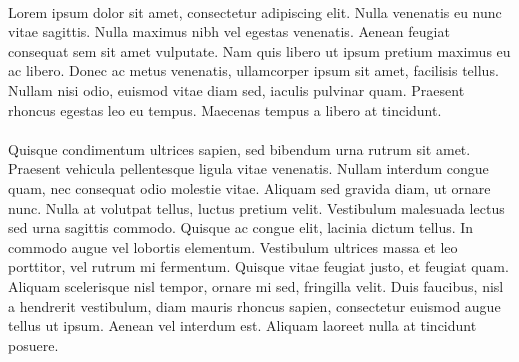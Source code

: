 \documentclass[../main.tex]{subfiles}
\begin{document}
\paragraph{}
Lorem ipsum dolor sit amet, consectetur adipiscing elit. Nulla venenatis eu nunc vitae sagittis. Nulla maximus nibh vel egestas venenatis. Aenean feugiat consequat sem sit amet vulputate. Nam quis libero ut ipsum pretium maximus eu ac libero. Donec ac metus venenatis, ullamcorper ipsum sit amet, facilisis tellus. Nullam nisi odio, euismod vitae diam sed, iaculis pulvinar quam. Praesent rhoncus egestas leo eu tempus. Maecenas tempus a libero at tincidunt.

\paragraph{}
Quisque condimentum ultrices sapien, sed bibendum urna rutrum sit amet. Praesent vehicula pellentesque ligula vitae venenatis. Nullam interdum congue quam, nec consequat odio molestie vitae. Aliquam sed gravida diam, ut ornare nunc. Nulla at volutpat tellus, luctus pretium velit. Vestibulum malesuada lectus sed urna sagittis commodo. Quisque ac congue elit, lacinia dictum tellus. In commodo augue vel lobortis elementum. Vestibulum ultrices massa et leo porttitor, vel rutrum mi fermentum. Quisque vitae feugiat justo, et feugiat quam. Aliquam scelerisque nisl tempor, ornare mi sed, fringilla velit. Duis faucibus, nisl a hendrerit vestibulum, diam mauris rhoncus sapien, consectetur euismod augue tellus ut ipsum. Aenean vel interdum est. Aliquam laoreet nulla at tincidunt posuere.
\end{document}
